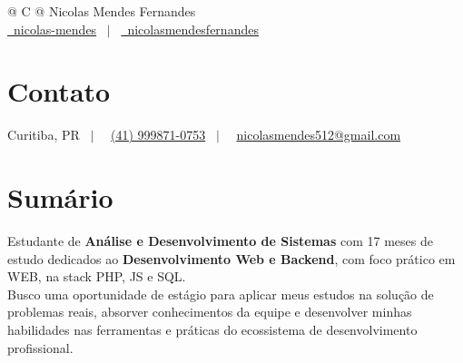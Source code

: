 \documentclass[a4paper,12pt]{article}
\begin{document}
\pagestyle{empty} 


\begin{tabularx}{\linewidth}{@{} C @{}}
\Huge{Nicolas Mendes Fernandes} \\ [7.5pt]
\href{https://github.com/nicolas-mendes}{\raisebox{-0.05\height}\faGithub\ nicolas-mendes} \ $|$ \ 
\href{https://linkedin.com/in/nicolasmendesfernandes}{\raisebox{-0.05\height}\faLinkedin\ nicolasmendesfernandes} \\

\end{tabularx}


\section*{Contato}
\begin{center}
    \faMapMarker*{} Curitiba, PR \ $|$ \ 
    \faPhone\ \href{tel:+55419987107538}{(41) 999871-0753} \ $|$ \ 
    \faEnvelope\ \href{mailto:nicolasmendes512@gmail.com}{nicolasmendes512@gmail.com}
\end{center}



\section*{Sumário}
Estudante de  \textbf{Análise e Desenvolvimento de Sistemas} com 17 meses de estudo dedicados ao \textbf{Desenvolvimento Web e Backend}, com foco prático em WEB, na stack PHP, JS e SQL. \\
Busco uma oportunidade de estágio para aplicar meus estudos na solução de problemas reais, 
absorver conhecimentos da equipe e desenvolver minhas habilidades nas ferramentas e práticas do ecossistema de desenvolvimento profissional.

\end{document}
